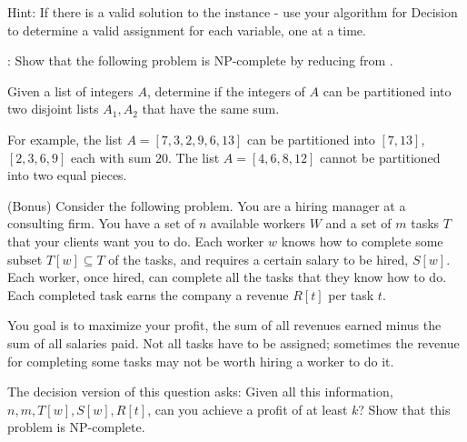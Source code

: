 \begin{questions}
  Hint: If there is a valid solution to the \SAT instance - use your algorithm
  for Decision \SAT to determine a valid assignment for each variable, one at
  a time.
  \begin{solution}
  \end{solution}

  
  \question[20] :
  Show that the following problem is NP-complete by reducing from \SSM.

  Given a list of integers $A$, determine if the integers of $A$ can be
  partitioned into two disjoint lists $A_1, A_2$ that have the same sum.

  For example, the list $A = [7, 3, 2, 9, 6, 13]$ can be partitioned into
  $[7,13]$, $[2,3,6,9]$ each with sum $20$. The list $A = [4,6,8,12]$ cannot be
  partitioned into two equal pieces.
  \begin{solution}
  \end{solution}

  \question (Bonus) Consider the following problem.
  You are a hiring manager at a consulting firm.
  You have a set of $n$ available workers $W$ and a set of $m$ tasks $T$ that
  your clients want you to do.
  Each worker $w$ knows how to complete some subset $T[w] \subseteq T$ of the
  tasks, and requires a certain salary to be hired, $S[w]$.
  Each worker, once hired, can complete all the tasks that they know
  how to do. Each completed task earns the company a revenue $R[t]$ per task
  $t$.

  You goal is to maximize your profit, the sum of all revenues earned minus
  the sum of all salaries paid.  Not all tasks have to be assigned; sometimes
  the revenue for completing some tasks may not be worth hiring a worker to do
  it. 

  The decision version of this question asks: Given all this information, $n,
  m, T[w], S[w], R[t]$, can you achieve a profit of at least $k$?  Show that
  this problem is NP-complete.
  \begin{solution}
  \end{solution}
\end{questions}



